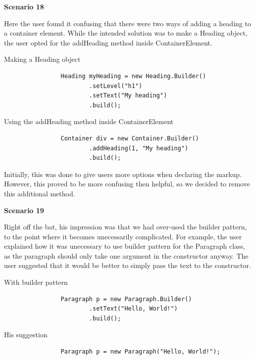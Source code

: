 \documentclass[12pt]{article}
\begin{document}
        \textbf{Scenario 18}

        Here the user found it confusing that there were two ways of adding a heading to a container element. While the intended solution was to make a Heading object, the user opted for the addHeading method inside ContainerElement.

        \begin{shaded}
            Making a Heading object

            \begin{lstlisting}
                Heading myHeading = new Heading.Builder()
                        .setLevel("h1")
                        .setText("My heading")
                        .build();
            \end{lstlisting}

            Using the addHeading method inside ContainerElement

            \begin{lstlisting}
                Container div = new Container.Builder()
                        .addHeading(1, "My heading")
                        .build();
            \end{lstlisting}
        \end{shaded}

        Initially, this was done to give users more options when declaring the markup. However, this proved to be more confusing then helpful, so we decided to remove this additional method.

        \textbf{Scenario 19}

        Right off the bat, his impression was that we had over-used the builder pattern, to the point where it becomes unecessarily complicated. For example, the user explained how it was unecessary to use builder pattern for the Paragraph class, as the paragraph should only take one argument in the constructor anyway. The user suggested that it would be better to simply pass the text to the constructor.

        \begin{shaded}
            With builder pattern

            \begin{lstlisting}
                Paragraph p = new Paragraph.Builder()
                        .setText("Hello, World!")
                        .build();
            \end{lstlisting}

            His suggestion

            \begin{lstlisting}
                Paragraph p = new Paragraph("Hello, World!");
            \end{lstlisting}
        \end{shaded}
\end{document}

